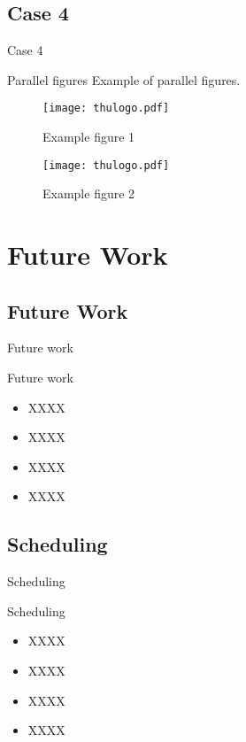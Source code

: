 \documentclass{beamer}
\begin{document}
\subsection{Case 4}

\begin{frame}{Case 4}
  \begin{block}{Parallel figures}
    Example of parallel figures.
  \end{block}
  \begin{figure}[htbp]
    \centering
    \begin{minipage}[t]{0.48\textwidth}
      \centering
      \texttt{[image: thulogo.pdf]}
      \caption{Example figure 1}
      \label{fig:left_side}
    \end{minipage}
    \begin{minipage}[t]{0.48\textwidth}
      \centering
      \texttt{[image: thulogo.pdf]}
      \caption{Example figure 2}
      \label{fig:right_side}
    \end{minipage}
  \end{figure}
\end{frame}

\section{Future Work}

\subsection{Future Work}

\begin{frame}{Future work}
  \begin{block}{Future work}
    \begin{itemize}
      \setlength{\itemsep}{6pt}
      \item XXXX
      \item XXXX
      \item XXXX
      \item XXXX
    \end{itemize}
  \end{block}
\end{frame}

\subsection{Scheduling}

\begin{frame}{Scheduling}
  \begin{block}{Scheduling}
    \begin{itemize}
      \setlength{\itemsep}{6pt}
      \item XXXX\cite{webster2010}
      \item XXXX\cite{jones2006}
      \item XXXX\cite{mcmahan2005}
      \item XXXX\cite{Gravagne2003}
    \end{itemize}
  \end{block}
\end{frame}
\end{document}
